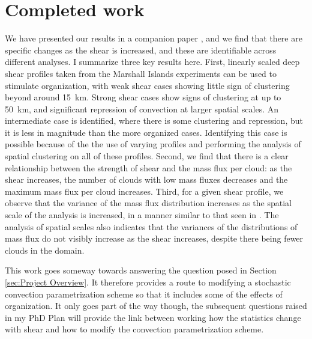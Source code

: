 \documentclass[11pt,a4paper]{article}
\newcommand\todo[1]{\textbf{TODO: #1}}
\begin{document}



\section{Completed work}

We have presented our results in a companion paper \parencite{muetz2017effects}, and we find that there are specific changes as the shear is increased, and these are identifiable across different analyses. I summarize three key results here. First, linearly scaled deep shear profiles taken from the Marshall Islands experiments \parencite{yanai1973determination} can be used to stimulate organization, with weak shear cases showing little sign of clustering beyond around \SI{15}{km}. Strong shear cases show signs of clustering at up to \SI{50}{km}, and significant repression of convection at larger spatial scales. An intermediate case is identified, where there is some clustering and repression, but it is less in magnitude than the more organized cases. Identifying this case is possible because of the the use of varying profiles and performing the analysis of spatial clustering on all of these profiles. Second, we find that there is a clear relationship between the strength of shear and the mass flux per cloud: as the shear increases, the number of clouds with low mass fluxes decreases and the maximum mass flux per cloud increases. Third, for a given shear profile, we observe that the variance of the mass flux distribution increases as the spatial scale of the analysis is increased, in a manner similar to that seen in \cite{plant2008stochastic}. The analysis of spatial scales also indicates that the variances of the distributions of mass flux do not visibly increase as the shear increases, despite there being fewer clouds in the domain.

This work goes someway towards answering the question posed in Section \ref{sec:Project Overview}. It therefore provides a route to modifying a stochastic convection parametrization scheme so that it includes some of the effects of organization. It only goes part of the way though, the subsequent questions raised in my PhD Plan will provide the link between working how the statistics change with shear and how to modify the convection parametrization scheme. 
\end{document}
